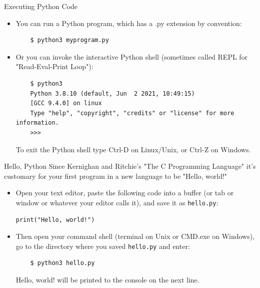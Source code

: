 \documentclass[smaller, aspectratio=1610]{beamer}
\begin{document}
\begin{frame}[label={sec:org453dbea},fragile]{Executing Python Code}
 \begin{itemize}
\item You can run a Python program, which has a .py extension by convention:

\lstset{language=sh,label= ,caption= ,captionpos=b,numbers=none}
\begin{lstlisting}
    $ python3 myprogram.py
\end{lstlisting}

\item Or you can invoke the interactive Python shell (sometimes called REPL for "Read-Eval-Print Loop"):

\lstset{language=sh,label= ,caption= ,captionpos=b,numbers=none}
\begin{lstlisting}
    $ python3
    Python 3.8.10 (default, Jun  2 2021, 10:49:15)
    [GCC 9.4.0] on linux
    Type "help", "copyright", "credits" or "license" for more information.
    >>>
\end{lstlisting}

To exit the Python shell type Ctrl-D on Linux/Unix, or Ctrl-Z on Windows.
\end{itemize}
\end{frame}

\begin{frame}[label={sec:orgdce7ec1},fragile]{Hello, Python}
 Since Kernighan and Ritchie's "The C Programming Language" it's customary for your first program in a new language to be "Hello, world!"

\begin{itemize}
\item Open your text editor, paste the following code into a buffer (or tab or window or whatever your editor calls it), and save it as \texttt{hello.py}:

\lstset{language=Python,label= ,caption= ,captionpos=b,numbers=none}
\begin{lstlisting}
print("Hello, world!")
\end{lstlisting}

\item Then open your command shell (terminal on Unix or CMD.exe on Windows), go to the directory where you saved \texttt{hello.py} and enter:

\lstset{language=sh,label= ,caption= ,captionpos=b,numbers=none}
\begin{lstlisting}
    $ python3 hello.py
\end{lstlisting}

Hello, world! will be printed to the console on the next line.
\end{itemize}
\end{frame}
\end{document}
